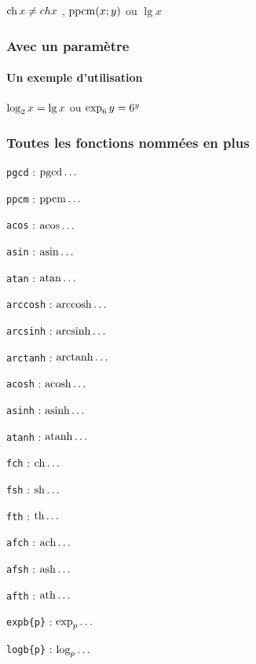 \documentclass[12pt,a4paper]{article}
\theoremstyle{definition}
\begin{document}
\begin{latexex}
$\fch x \neq ch x$ ,
$\ppcm(x;y)$ ou
$\lg x$
\end{latexex}




\subsubsection{Avec un paramètre}

\paragraph{Un exemple d'utilisation}

\begin{latexex}
$\logb{2} x = \lg x$ ou
$\expb{6} y = 6^y$
\end{latexex}




\subsubsection{Toutes les fonctions nommées en plus}

\vspace{-1em}

\begin{multicols}{2}
\verb+pgcd+ : $\pgcd\dots$

\verb+ppcm+ : $\ppcm\dots$

\verb+acos+ : $\acos\dots$

\verb+asin+ : $\asin\dots$

\verb+atan+ : $\atan\dots$

\verb+arccosh+ : $\arccosh\dots$

\verb+arcsinh+ : $\arcsinh\dots$

\verb+arctanh+ : $\arctanh\dots$

\verb+acosh+ : $\acosh\dots$

\verb+asinh+ : $\asinh\dots$

\verb+atanh+ : $\atanh\dots$

\verb+fch+ : $\fch\dots$

\verb+fsh+ : $\fsh\dots$

\verb+fth+ : $\fth\dots$

\verb+afch+ : $\afch\dots$

\verb+afsh+ : $\afsh\dots$

\verb+afth+ : $\afth\dots$

\verb+expb{p}+ : $\expb{p}\dots$

\verb+logb{p}+ : $\logb{p}\dots$
\end{multicols}
\end{document}
